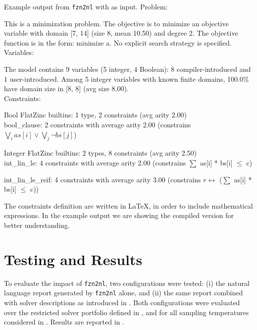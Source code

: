 \documentclass[../../main]{subfiles}
\begin{document}
\begin{definition}{Example output from \texttt{fzn2nl} with  as input.}
Problem: 

This is a minimization problem. The objective is to minimize an objective variable with domain [7, 14] (size 8, mean 10.50) and degree 2. The objective function is in the form: minimize a. No explicit search strategy is specified.\\

Variables:

The model contains 9 variables (5 integer, 4 Boolean): 8 compiler-introduced and 1 user-introduced.
Among 5 integer variables with known finite domains, 100.0\% have domain size in [8, 8] (avg size 8.00).\\

Constraints:

Bool FlatZinc builtins: 1 type, 2 constraints (avg arity 2.00)\\
\quad bool\_clause: 2 constraints with average arity 2.00 
(constrains $\bigvee_i as[i] \lor \bigvee_j \lnot bs[j]$)

Integer FlatZinc builtins: 2 types, 8 constraints (avg arity 2.50)\\
int\_lin\_le: 4 constraints with average arity 2.00 
(constrains $\sum$ as[i] * bs[i] $\leq$ c)

int\_lin\_le\_reif: 4 constraints with average arity 3.00 
(constrains $r \leftrightarrow$ ($\sum$ as[i] * bs[i] $\leq$ c))
\end{definition}

The constraints definition are written in \LaTeX, in order to include mathematical expressions. In the example output we are showing the compiled version for better understanding.


\section{Testing and Results}
\label{sec:fzn2nlTest}

To evaluate the impact of \texttt{fzn2nl}, two configurations were tested: (i) the natural language report generated by \texttt{fzn2nl} alone, and (ii) the same report combined with solver descriptions as introduced in . Both configurations were evaluated over the restricted solver portfolio defined in , and for all sampling temperatures considered in . Results are reported in .
\end{document}
